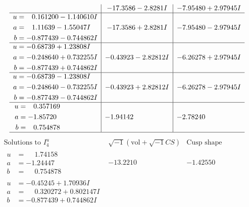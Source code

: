 \documentclass[1p]{elsarticle_modified}
\theoremstyle{definition}
\newcommand{\I}{\sqrt{-1}}
\begin{document}
$$\begin{array}{c|c|c}
 & -17.3586 - 2.8281 I & -7.95480 + 2.97945 I \\ \hline\begin{aligned}
u &= \phantom{-}0.161200 - 1.140610 I \\
a &= \phantom{-}1.11639 - 1.55047 I \\
b &= -0.877439 - 0.744862 I\end{aligned}
 & -17.3586 + 2.8281 I & -7.95480 - 2.97945 I \\ \hline\begin{aligned}
u &= -0.68739 + 1.23808 I \\
a &= -0.248640 + 0.732255 I \\
b &= -0.877439 + 0.744862 I\end{aligned}
 & -0.43923 - 2.82812 I & -6.26278 + 2.97945 I \\ \hline\begin{aligned}
u &= -0.68739 - 1.23808 I \\
a &= -0.248640 - 0.732255 I \\
b &= -0.877439 - 0.744862 I\end{aligned}
 & -0.43923 + 2.82812 I & -6.26278 - 2.97945 I \\ \hline\begin{aligned}
u &= \phantom{-}0.357169\phantom{ +0.000000I} \\
a &= -1.85720\phantom{ +0.000000I} \\
b &= \phantom{-}0.754878\phantom{ +0.000000I}\end{aligned}
 & -1.94142\phantom{ +0.000000I} & -2.78240\phantom{ +0.000000I}\\
 \hline 
 \end{array}$$\newpage$$\begin{array}{c|c|c}  
\text{Solutions to }I^u_{4}& \I (\text{vol} + \sqrt{-1}CS) & \text{Cusp shape}\\
 \hline 
\begin{aligned}
u &= \phantom{-}1.74158\phantom{ +0.000000I} \\
a &= -1.24447\phantom{ +0.000000I} \\
b &= \phantom{-}0.754878\phantom{ +0.000000I}\end{aligned}
 & -13.2210\phantom{ +0.000000I} & -1.42550\phantom{ +0.000000I} \\ \hline\begin{aligned}
u &= -0.45245 + 1.70936 I \\
a &= \phantom{-}0.320272 + 0.802147 I \\
b &= -0.877439 + 0.744862 I\end{aligned}

\end{array}$$
\end{document}
